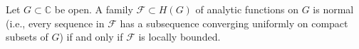 Let $G \subset \mathbb{C}$ be open. A family $\mathcal{F} \subset H(G)$ of analytic functions on $G$ is normal (i.e., every sequence in $\mathcal{F}$ has a subsequence converging uniformly on compact subsets of $G$) if and only if $\mathcal{F}$ is locally bounded.
